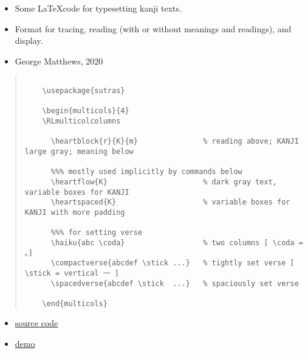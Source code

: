 \documentclass[letterpaper]{article}
\begin{document}
	\vspace*{3cm}
	

\vspace*{2cm}
	    
	    \begin{itemize}
	    	\item[]  Some \LaTeX code for typesetting kanji texts.
	    	\item[] Format for tracing, reading (with or without meanings and readings), and display.
	    	\item[] \cc George Matthews, 2020
	    \end{itemize}
	    
	    
\vspace*{1cm}
	
	\begin{quotation}
		
	\begin{verbatim}
	
	\usepackage{sutras}
	
	\begin{multicols}{4}
	\RLmulticolcolumns
	
	  \heartblock{r}{K}{m}               % reading above; KANJI large gray; meaning below
	
	  %%% mostly used implicitly by commands below
	  \heartflow{K}                      % dark gray text, variable boxes for KANJI 
	  \heartspaced{K}                    % variable boxes for KANJI with more padding
	  
	  %%% for setting verse
	  \haiku{abc \coda}                  % two columns [ \coda = 。]
	  \compactverse{abcdef \stick ...}   % tightly set verse [ \stick = vertical 一 ]
	  \spacedverse{abcdef \stick  ...}   % spaciously set verse
	
	\end{multicols}
	\end{verbatim}
	
\end{quotation}
	
	\vspace*{1cm}
 
	\begin{itemize}
		
			\item[] {\Large 
			 \href{https://github.com/gwmatthews/TheFourVows}{source code}}
			 \item[] {\Large 
			 	\href{https://gwmatthews.github.io/the-four-vows.pdf}{demo}}
		
	\end{itemize}
	
\end{document}

